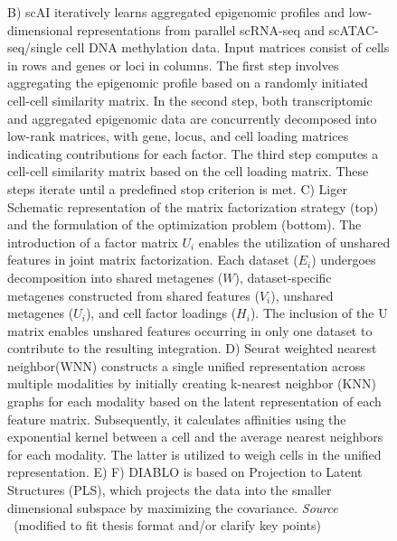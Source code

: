 \addtocounter{figure}{-1}
\begin{figure}[t!]
  \caption[]{
	B) scAI iteratively learns aggregated epigenomic profiles and low-dimensional representations from parallel scRNA-seq and scATAC-seq/single cell DNA methylation data. Input matrices consist of cells in rows and genes or loci in columns. The first step involves aggregating the epigenomic profile based on a randomly initiated cell-cell similarity matrix. In the second step, both transcriptomic and aggregated epigenomic data are concurrently decomposed into low-rank matrices, with gene, locus, and cell loading matrices indicating contributions for each factor. The third step computes a cell-cell similarity matrix based on the cell loading matrix. These steps iterate until a predefined stop criterion is met.
	C) Liger Schematic representation of the matrix factorization strategy (top) and the formulation of the optimization problem (bottom). The introduction of a factor matrix $U_i$ enables the utilization of unshared features in joint matrix factorization. Each dataset ($E_i$) undergoes decomposition into shared metagenes ($W$), dataset-specific metagenes constructed from shared features ($V_i$), unshared metagenes ($U_i$), and cell factor loadings ($H_i$). The inclusion of the U matrix enables unshared features occurring in only one dataset to contribute to the resulting integration.
	D) Seurat weighted nearest neighbor(WNN) constructs a single unified representation across multiple modalities by initially creating k-nearest neighbor (KNN) graphs for each modality based on the latent representation of each feature matrix. Subsequently, it calculates affinities using the exponential kernel between a cell and the average nearest neighbors for each modality. The latter is utilized to weigh cells in the unified representation.
	E)
	F) DIABLO is based on Projection to Latent Structures (PLS), which projects the data into the smaller dimensional subspace by maximizing the covariance. \emph{Source ~\cite{tewari2017mofa,jin2020scai,kriebel2022uinmf,hao2021seurat4,singh2021schema,singh2019diablo}}(modified to fit thesis format and/or clarify key points)
  }
\end{figure}
